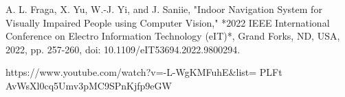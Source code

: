 \begin{thebibliography}{9}
	A. L. Fraga, X. Yu, W.-J. Yi, and J. Saniie, "Indoor Navigation System for Visually Impaired People using Computer Vision," *2022 IEEE International Conference on Electro Information Technology (eIT)*, Grand Forks, ND, USA, 2022, pp. 257-260, doi: 10.1109/eIT53694.2022.9800294.

	https://www.youtube.com/watch?v=-L-WgKMFuhE\&list=
	PLFt AvWsXl0cq5Umv3pMC9SPnKjfp9eGW
	
	
	
\end{thebibliography}